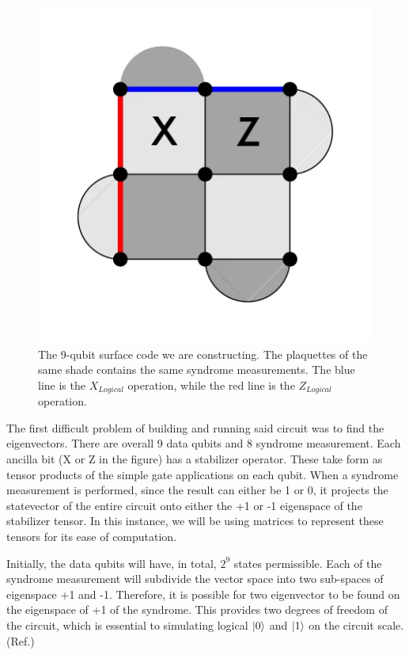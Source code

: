 \documentclass{article}
\begin{document}
\begin{figure}[h]
    \centering
    \includegraphics[width = 0.7\linewidth]{surface/9-qubit.png}
    \caption{The 9-qubit surface code  we are constructing. The plaquettes of the same shade contains the same syndrome measurements. The blue line is the $X_{Logical}$ operation, while the red line is the $Z_{Logical}$ operation.}
    \label{fig:my_label}
\end{figure}

The first difficult problem of building and running said circuit was to find the eigenvectors. There are overall 9 data qubits and 8 syndrome measurement. Each ancilla bit (X or Z in the figure) has a stabilizer operator. These take form as tensor products of the simple gate applications on each qubit. When a syndrome measurement is performed, since the result can either be 1 or 0, it projects the statevector of the entire circuit onto either the +1 or -1 eigenspace of the stabilizer tensor. In this instance, we will be using matrices to represent these tensors for its ease of computation.

Initially, the data qubits will have, in total, $2^9$ states permissible. Each of the syndrome measurement will subdivide the vector space into two sub-spaces of eigenspace +1 and -1. Therefore, it is possible for two eigenvector to be found on the eigenspace of +1 of the syndrome. This provides two degrees of freedom of the circuit, which is essential to simulating logical $\ket{0}$ and $\ket{1}$ on the circuit scale. (Ref.\cite{zatloukalStabilizerCircuits})
\end{document}
